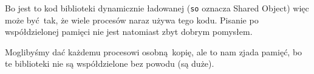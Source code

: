Bo jest to kod biblioteki dynamicznie ładowanej (\texttt{so} oznacza Shared Object) więc może być tak, że wiele procesów naraz
używa tego kodu. 
Pisanie po współdzielonej pamięci nie jest natomiast zbyt dobrym pomysłem.

Moglibyśmy dać każdemu procesowi osobną kopię, ale to nam zjada pamięć, bo te biblioteki nie są współdzielone bez powodu (są duże).